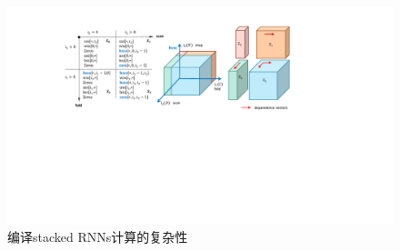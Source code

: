 \begin{figure}[h]
  \centering
  \includegraphics[width=1.\textwidth]{figures/cond_branchs.pdf}
  \caption{编译stacked RNNs计算的复杂性}\label{cond_branchs}
\end{figure}